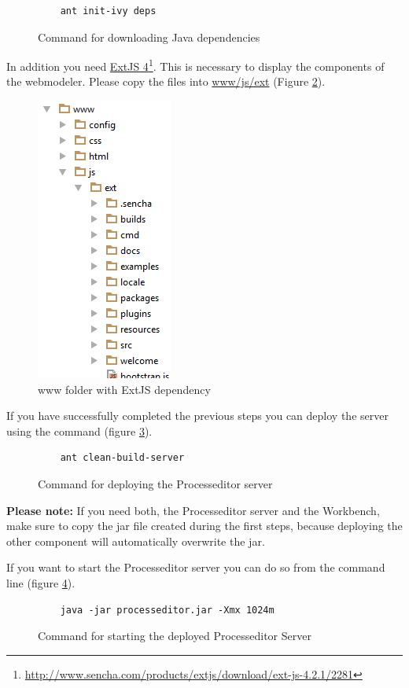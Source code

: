 \begin{figure}[h!]
\begin{verbatim}
	ant init-ivy deps
\end{verbatim}
\caption{Command for downloading Java dependencies}
\label{lis:ivy}
\end{figure}

In addition you need \href{http://www.sencha.com/products/extjs/download/ext-js-4.2.1/2281}{ExtJS 4}\footnote{\url{http://www.sencha.com/products/extjs/download/ext-js-4.2.1/2281}}. This is necessary to display the components of the webmodeler. Please copy the files into \url{www/js/ext} (Figure \ref{pic:ext}).

\begin{figure}[h!]
\includegraphics{graphics/wwwWithExt.png}
\caption{www folder with ExtJS dependency}
\label{pic:ext}
\end{figure}

If you have successfully completed the previous steps you can deploy the server using the command (figure \ref{lis:deps}).

\begin{figure}[h!]
\begin{verbatim}
	ant clean-build-server
\end{verbatim}
\caption{Command for deploying the Processeditor server}
\label{lis:deps}
\end{figure}

\begin{leftbar}
\textbf{
Please note:} If you need both, the Processeditor server and the Workbench, make sure to copy the jar file created during the first steps, because deploying the other component will automatically overwrite the jar.
\end{leftbar}

If you want to start the Processeditor server you can do so from the command line (figure \ref{lis:startserver}).

\begin{figure}[h!]
\begin{verbatim}
	java -jar processeditor.jar -Xmx 1024m
\end{verbatim}
\caption{Command for starting the deployed Processeditor Server}
\label{lis:startserver}
\end{figure}